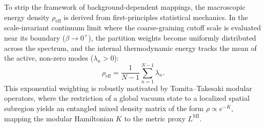 \documentclass[onecolumn,PRD,amsmath,amssymb,aps,nofootinbib,superscriptaddress,11pt]{revtex4-2}
\begin{document}
To strip the framework of background-dependent mappings, the macroscopic energy density $\rho_{\text{eff}}$ is derived from first-principles statistical mechanics. In the scale-invariant continuum limit where the coarse-graining cutoff scale is evaluated near its boundary ($\beta \rightarrow 0^+$), the partition weights become uniformly distributed across the spectrum, and the internal thermodynamic energy tracks the mean of the active, non-zero modes ($\lambda_n > 0$):
\begin{equation}
\rho_{\text{eff}} = \frac{1}{N-1}\sum_{n=1}^{N-1} \lambda_n.
\label{eq:rhoeff}
\end{equation}
This exponential weighting is robustly motivated by Tomita--Takesaki modular operators, where the restriction of a global vacuum state to a localized spatial subregion yields an entangled mixed density matrix of the form $\rho \propto e^{-K}$, mapping the modular Hamiltonian $K$ to the metric proxy $L^{\text{MI}}$.
\end{document}

